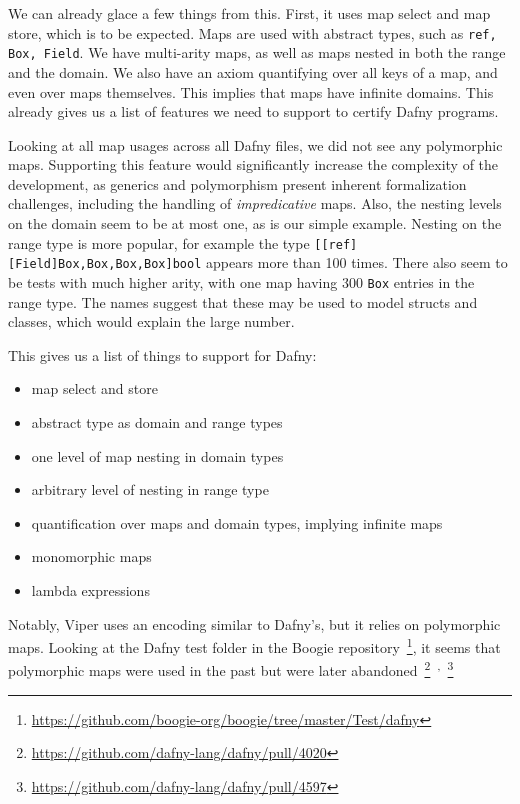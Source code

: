 We can already glace a few things from this.
First, it uses map select and map store, which is to be expected.
Maps are used with abstract types, such as \lstinline[columns=fixed]{ref, Box, Field}.
We have multi-arity maps, as well as maps nested in both the range and the domain.
We also have an axiom quantifying over all keys of a map, and even over maps themselves.
This implies that maps have infinite domains.
This already gives us a list of features we need to support to certify Dafny programs.

Looking at all map usages across all Dafny files,
we did not see any polymorphic maps.
Supporting this feature would significantly increase the complexity of the development, as generics and polymorphism present inherent formalization challenges, %
including the handling of \emph{impredicative} maps. %
Also, the nesting levels on the domain seem to be at most one, as is our simple example.
Nesting on the range type is more popular, for example the type 
\lstinline[columns=fixed]{[[ref][Field]Box,Box,Box,Box]bool} appears more than 100 times.
There also seem to be tests with much higher arity, with one map having 300 \lstinline[columns=fixed]{Box} entries in the range type.
The names suggest that these may be used to model structs and classes, which would explain the large number.

This gives us a list of things to support for Dafny:
\begin{itemize}
  \item map select and store
  \item abstract type as domain and range types
  \item one level of map nesting in domain types
  \item arbitrary level of nesting in range type
  \item quantification over maps and domain types, implying infinite maps
  \item monomorphic maps
  \item lambda expressions
\end{itemize}

Notably, Viper uses an encoding similar to Dafny's, but it relies on polymorphic maps. %
Looking at the Dafny test folder in the Boogie repository~\footnote{\url{https://github.com/boogie-org/boogie/tree/master/Test/dafny}},
it seems that polymorphic maps were used in the past but were later abandoned~\footnote{\url{https://github.com/dafny-lang/dafny/pull/4020}}~\textsuperscript{,}~\footnote{\url{https://github.com/dafny-lang/dafny/pull/4597}}



